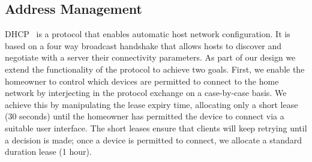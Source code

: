 \subsection{Address Management} \label{s:addresses}

DHCP~ is a protocol that enables automatic host network
configuration. It is based on a four way broadcast handshake that allows hosts
to discover and negotiate with a server their connectivity parameters.  As part
of our design we extend the functionality of the protocol to achieve two goals.
First, we enable the homeowner to control which devices are permitted to connect
to the home network by interjecting in the protocol exchange on a case-by-case
basis.  We achieve this by manipulating the lease expiry time, allocating only a
short lease (30 seconds) until the homeowner has permitted the device to connect via a
suitable user interface.  The short leases ensure that clients will keep
retrying until a decision is made; once a device is permitted to connect, we
allocate a standard duration lease (1 hour).

